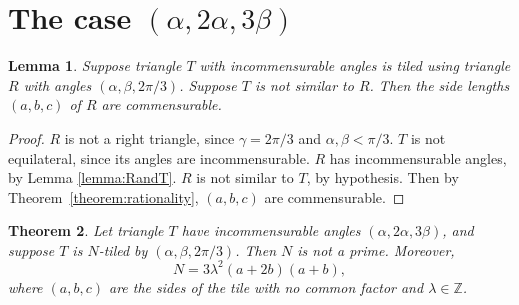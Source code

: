 \documentclass{amsart}
\theoremstyle{plain}
\newtheorem{theorem}{Theorem}
\newtheorem{lemma}[theorem]{Lemma}
\theoremstyle{definition}
\theoremstyle{remark}
\def\Z{{\mathbb Z}}
\begin{document}
\section{The case $(\alpha,2\alpha,3\beta)$}

\begin{lemma}\label{lemma:rationality3}
Suppose triangle $T$ with incommensurable angles is tiled using triangle $R$ with angles $(\alpha, \beta, 2\pi/3)$.
Suppose $T$ is not similar to $R$.
Then the side lengths $(a,b,c)$ of $R$ are commensurable.
\end{lemma}

\begin{proof}
$R$ is not a right triangle, since $\gamma = 2\pi/3$ and $\alpha, \beta < \pi/3$.
$T$ is not equilateral, since its angles are incommensurable.
$R$ has incommensurable angles, by Lemma \ref{lemma:RandT}.
$R$ is not similar to $T$, by hypothesis.  Then by Theorem~\ref{theorem:rationality},
$(a,b,c)$ are commensurable.
\end{proof}

\begin{theorem} \label{theorem:case2}  Let triangle $T$ have incommensurable angles 
$(\alpha, 2\alpha, 3\beta)$, and suppose $T$ is $N$-tiled  by $(\alpha,\beta,2\pi/3)$.
Then $N$ is not a prime.  Moreover,
$$ N =  3\lambda^2 (a+2b)  (a+b),$$
where $(a,b,c)$ are the sides of the tile with no common factor and $\lambda \in \Z$.
\end{theorem}
\end{document}
